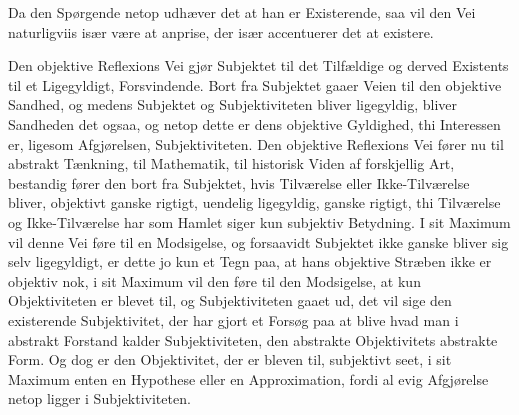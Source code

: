 \documentclass[12pt,a4paper]{article}
\begin{document}
Da den Spørgende netop udhæver det at han er Existerende, saa vil den Vei naturligviis især være at anprise, der især accentuerer det at existere.

Den objektive Reflexions Vei gjør Subjektet til det Tilfældige og derved Existents til et Ligegyldigt, Forsvindende. Bort fra Subjektet gaaer Veien til den objektive Sandhed, og medens Subjektet og Subjektiviteten bliver ligegyldig, bliver Sandheden det ogsaa, og netop dette er dens objektive Gyldighed, thi Interessen er, ligesom Afgjørelsen, Subjektiviteten. Den objektive Reflexions Vei fører nu til abstrakt Tænkning, til Mathematik, til historisk Viden af forskjellig Art, bestandig fører den bort fra Subjektet, hvis Tilværelse eller Ikke-Tilværelse bliver, objektivt ganske rigtigt, uendelig ligegyldig, ganske rigtigt, thi Tilværelse og Ikke-Tilværelse har som Hamlet siger kun subjektiv Betydning. I sit Maximum vil denne Vei føre til en Modsigelse, og forsaavidt Subjektet ikke ganske bliver sig selv ligegyldigt, er dette jo kun et Tegn paa, at hans objektive Stræben ikke er objektiv nok, i sit Maximum vil den føre til den Modsigelse, at kun Objektiviteten er blevet til, og Subjektiviteten gaaet ud, det vil sige den existerende Subjektivitet, der har gjort et Forsøg paa at blive hvad man i abstrakt Forstand kalder Subjektiviteten, den abstrakte Objektivitets abstrakte Form. Og dog er den Objektivitet, der er bleven til, subjektivt seet, i sit Maximum enten en Hypothese eller en Approximation, fordi al evig Afgjørelse netop ligger i Subjektiviteten.
\end{document}
